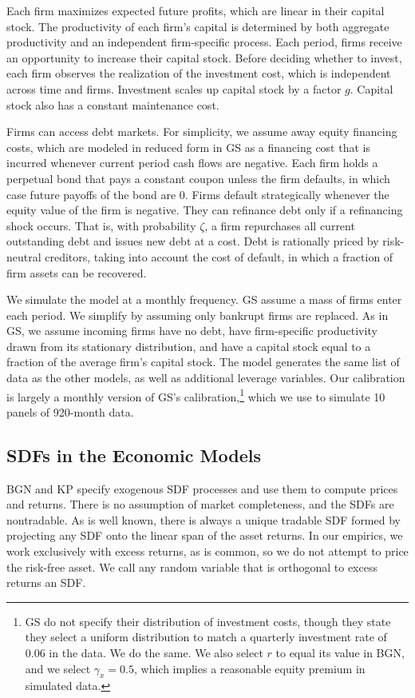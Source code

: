 \documentclass[12pt]{scrarticle}
\begin{document}
Each firm maximizes expected future profits, which are linear in their capital stock. The productivity of each firm's capital is determined by both aggregate productivity and an independent firm-specific process. Each period, firms receive an opportunity to increase their capital stock. Before deciding whether to invest, each firm observes the realization of the investment cost, which is independent across time and firms. Investment scales up capital stock by a factor $g$. Capital stock also has a constant maintenance cost.

Firms can access debt markets. For simplicity, we assume away equity financing costs, which are modeled in reduced form in GS as a financing cost that is incurred whenever current period cash flows are negative. Each firm holds a perpetual bond that pays a constant coupon unless the firm defaults, in which case future payoffs of the bond are 0. Firms default strategically whenever the equity value of the firm is negative. They can refinance debt only if a refinancing shock occurs. That is, with probability $\zeta$, a firm repurchases all current outstanding debt and issues new debt at a cost. Debt is rationally priced by risk-neutral creditors, taking into account the cost of default, in which a fraction of firm assets can be recovered.

We simulate the model at a monthly frequency. GS assume a mass of firms enter each period. We simplify by assuming only bankrupt firms are replaced. As in GS, we assume incoming firms have no debt, have firm-specific productivity drawn from its stationary distribution, and have a capital stock equal to a fraction of the average firm's capital stock. The model generates the same list of data as the other models, as well as additional leverage variables. Our calibration is largely a monthly version of GS's calibration,\footnote{GS do not specify their distribution of investment costs, though they state they select a uniform distribution to match a quarterly investment rate of 0.06 in the data. We do the same. We also select $r$ to equal its value in BGN, and we select $\gamma_x = 0.5$, which implies a reasonable equity premium in simulated data.} which we use to simulate 10 panels of 920-month data.


\subsection{SDFs in the Economic Models}\label{economic_sdf}

BGN and KP specify exogenous SDF processes and use them to compute prices and returns.  There is no assumption of market completeness, and the SDFs are nontradable.  As is well known, there is always a unique tradable SDF formed by projecting any SDF onto the linear span of the asset returns.  In our empirics, we work exclusively with excess returns, as is common, so we do not attempt to price the risk-free asset.  We call any random variable that is orthogonal to excess returns an SDF.  
\end{document}
